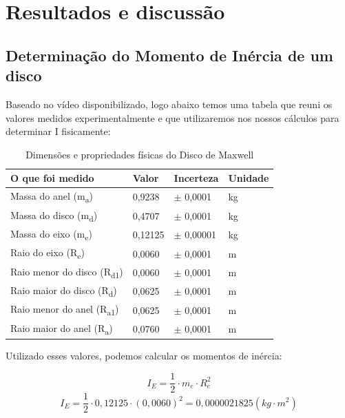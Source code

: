 \newpage
\section{Resultados e discussão}


\subsection{Determinação do Momento de Inércia de um disco}

Baseado no vídeo disponibilizado, logo abaixo temos uma tabela que reuni os valores medidos experimentalmente e que utilizaremos nos nossos cálculos para determinar I fisicamente:

\begin{table}[H]
    \centering
    \begin{tabular}{ |p{5cm}||p{2cm}||p{2cm}||p{2cm}|  }
        \hline
        \textbf{O que foi medido} & \textbf{Valor} & \textbf{Incerteza} & \textbf{Unidade}\\
        \hline
        Massa do anel (m\textsubscript{a})          & 0,9238    & $\pm$ 0,0001  & kg\\
        Massa do disco (m\textsubscript{d})         & 0,4707    & $\pm$ 0,0001  & kg\\
        Massa do eixo (m\textsubscript{e})          & 0,12125   & $\pm$ 0,00001 & kg\\
        Raio do eixo (R\textsubscript{e})           & 0,0060    & $\pm$ 0,0001  & m\\
        Raio menor do disco (R\textsubscript{d1})   & 0,0060    & $\pm$ 0,0001  & m\\
        Raio maior do disco (R\textsubscript{d})    & 0,0625    & $\pm$ 0,0001  & m\\
        Raio menor do anel (R\textsubscript{a1})    & 0,0625    & $\pm$ 0,0001  & m\\
        Raio maior do anel (R\textsubscript{a})     & 0,0760    & $\pm$ 0,0001  & m\\
        \hline
    \end{tabular}
    \caption{Dimensões e propriedades físicas do Disco de Maxwell}
\end{table}

Utilizado esses valores, podemos calcular os momentos de inércia:

\[I_E = \frac{1}{2} \cdot m_e \cdot R_e^2\]
\[I_E = \frac{1}{2} \cdot 0,12125 \cdot (0,0060)^2 = 0,0000021825 (kg \cdot m^2)\]

